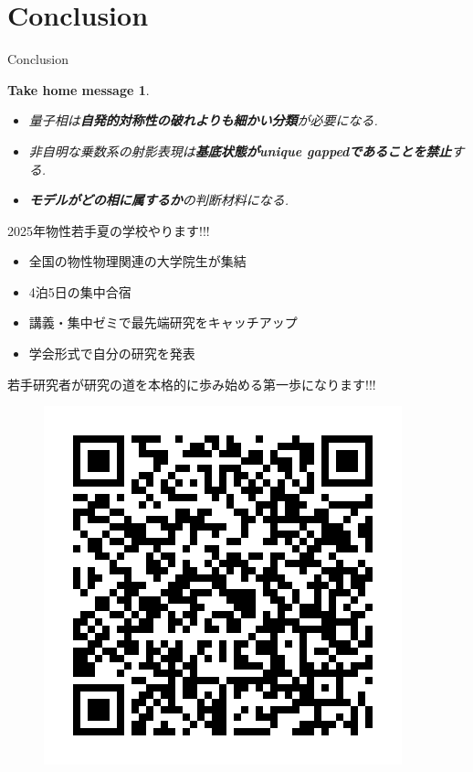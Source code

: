 \documentclass[dvipdfm]{beamer}
\newtheorem*{takehome}{Take home message}
\begin{document}
\section{Conclusion}

\begin{frame}{Conclusion}
    \begin{takehome}
        \begin{itemize}
            \item 量子相は\textbf{\alert{自発的対称性の破れよりも細かい分類}}が必要になる.
            \item 非自明な乗数系の射影表現は\textbf{\alert{基底状態がunique gappedであることを禁止}}する.
            \item \textbf{\alert{モデルがどの相に属するか}}の判断材料になる.
        \end{itemize}
    \end{takehome}



\end{frame}

\begin{frame}{2025年物性若手夏の学校やります!!!}
    \begin{itemize}
        \item 全国の物性物理関連の大学院生が集結
        \item 4泊5日の集中合宿
        \item 講義・集中ゼミで最先端研究をキャッチアップ
        \item 学会形式で自分の研究を発表
    \end{itemize}
    若手研究者が研究の道を本格的に歩み始める第一歩になります!!!

    \textbf{}

    \textbf{}
    \begin{figure}
        \centering
        \includegraphics[width=0.2\linewidth]{QR_992675.png}
    \end{figure}
\end{frame}
\end{document}
